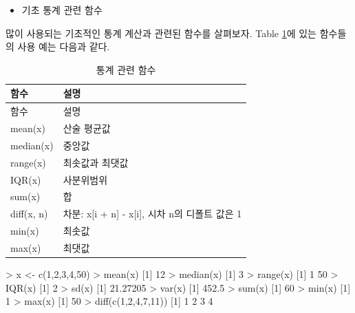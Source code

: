 \documentclass[
]{book}
\newenvironment{Shaded}{\begin{snugshade}}{\end{snugshade}}
\newcommand{\DecValTok}[1]{\textcolor[rgb]{0.00,0.00,0.81}{#1}}
\newcommand{\FloatTok}[1]{\textcolor[rgb]{0.00,0.00,0.81}{#1}}
\newcommand{\FunctionTok}[1]{\textcolor[rgb]{0.00,0.00,0.00}{#1}}
\newcommand{\NormalTok}[1]{#1}
\newcommand{\OtherTok}[1]{\textcolor[rgb]{0.56,0.35,0.01}{#1}}
\newcommand{\SpecialCharTok}[1]{\textcolor[rgb]{0.00,0.00,0.00}{#1}}
\providecommand{\tightlist}{%
  \setlength{\itemsep}{0pt}\setlength{\parskip}{0pt}}
\begin{document}
\begin{itemize}
\tightlist
\item
  기초 통계 관련 함수
\end{itemize}

많이 사용되는 기초적인 통계 계산과 관련된 함수를 살펴보자.
Table \ref{tab:stat-func}에 있는 함수들의 사용 예는 다음과 같다.

\begin{longtable}[]{@{}ll@{}}
\caption{\label{tab:stat-func}통계 관련 함수}\tabularnewline
\toprule
함수 & 설명 \\
\midrule
\endfirsthead
\toprule
함수 & 설명 \\
\midrule
\endhead
mean(x) & 산술 평균값 \\
median(x) & 중앙값 \\
range(x) & 최솟값과 최댓값 \\
IQR(x) & 사분위범위 \\
sum(x) & 합 \\
diff(x, n) & 차분: x{[}i + n{]} - x{[}i{]}, 시차 n의 디폴트 값은 1 \\
min(x) & 최솟값 \\
max(x) & 최댓값 \\
\bottomrule
\end{longtable}

\begin{Shaded}
\begin{Highlighting}[]
\SpecialCharTok{\textgreater{}}\NormalTok{ x }\OtherTok{\textless{}{-}} \FunctionTok{c}\NormalTok{(}\DecValTok{1}\NormalTok{,}\DecValTok{2}\NormalTok{,}\DecValTok{3}\NormalTok{,}\DecValTok{4}\NormalTok{,}\DecValTok{50}\NormalTok{)}
\SpecialCharTok{\textgreater{}} \FunctionTok{mean}\NormalTok{(x)}
\NormalTok{[}\DecValTok{1}\NormalTok{] }\DecValTok{12}
\SpecialCharTok{\textgreater{}} \FunctionTok{median}\NormalTok{(x)}
\NormalTok{[}\DecValTok{1}\NormalTok{] }\DecValTok{3}
\SpecialCharTok{\textgreater{}} \FunctionTok{range}\NormalTok{(x)}
\NormalTok{[}\DecValTok{1}\NormalTok{]  }\DecValTok{1} \DecValTok{50}
\SpecialCharTok{\textgreater{}} \FunctionTok{IQR}\NormalTok{(x)}
\NormalTok{[}\DecValTok{1}\NormalTok{] }\DecValTok{2}
\SpecialCharTok{\textgreater{}} \FunctionTok{sd}\NormalTok{(x)}
\NormalTok{[}\DecValTok{1}\NormalTok{] }\FloatTok{21.27205}
\SpecialCharTok{\textgreater{}} \FunctionTok{var}\NormalTok{(x)}
\NormalTok{[}\DecValTok{1}\NormalTok{] }\FloatTok{452.5}
\SpecialCharTok{\textgreater{}} \FunctionTok{sum}\NormalTok{(x)}
\NormalTok{[}\DecValTok{1}\NormalTok{] }\DecValTok{60}
\SpecialCharTok{\textgreater{}} \FunctionTok{min}\NormalTok{(x)}
\NormalTok{[}\DecValTok{1}\NormalTok{] }\DecValTok{1}
\SpecialCharTok{\textgreater{}} \FunctionTok{max}\NormalTok{(x)}
\NormalTok{[}\DecValTok{1}\NormalTok{] }\DecValTok{50}
\SpecialCharTok{\textgreater{}} \FunctionTok{diff}\NormalTok{(}\FunctionTok{c}\NormalTok{(}\DecValTok{1}\NormalTok{,}\DecValTok{2}\NormalTok{,}\DecValTok{4}\NormalTok{,}\DecValTok{7}\NormalTok{,}\DecValTok{11}\NormalTok{))}
\NormalTok{[}\DecValTok{1}\NormalTok{] }\DecValTok{1} \DecValTok{2} \DecValTok{3} \DecValTok{4}
\end{Highlighting}
\end{Shaded}
\end{document}
